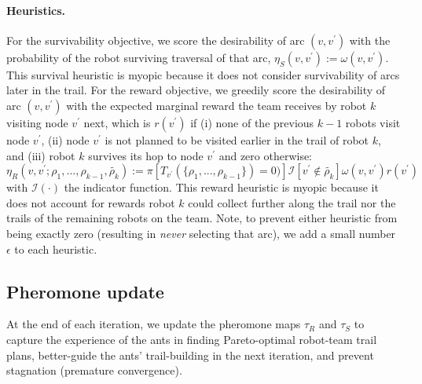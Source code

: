 \documentclass[fleqn,10pt,lineno]{wlpeerj}
\begin{document}

\paragraph{Heuristics.} 
For the survivability objective, we score the desirability of arc $(v, v^\prime)$ with the probability of the robot surviving traversal of that arc, $\eta_S(v, v^\prime):=\omega(v, v^\prime)$. This survival heuristic is myopic because it does not consider survivability of arcs later in the trail. 
For the reward objective, we greedily score the desirability of arc $(v, v^\prime)$ with the expected marginal reward the team receives by robot $k$ visiting node $v^\prime$ next, which is $r(v^\prime)$ if 
(i) none of the previous $k-1$ robots visit node $v^\prime$, 
(ii) node $v^\prime$ is not planned to be visited earlier in the trail of robot $k$, and
(iii) robot $k$ survives its hop to node $v^\prime$
and zero otherwise:
\begin{equation}
	\eta_R(v, v^\prime; \rho_1, ..., \rho_{k-1}, \tilde{\rho_k}) :=  
	 \pi[ T_{v^\prime}(\{\rho_1, ..., \rho_{k-1}\}) = 0)] \mathcal{I}[v^\prime \notin \tilde{\rho_k}] \omega(v, v^\prime) r(v^\prime ) \label{eq:eta_R}
\end{equation}
with $\mathcal{I}(\cdot)$ the indicator function. This reward heuristic is myopic because it does not account for rewards robot $k$ could collect further along the trail nor the trails of the remaining robots on the team. 
Note, to prevent either heuristic from being exactly zero (resulting in \emph{never} selecting that arc), we add a small number $\epsilon$ to each heuristic.


\subsection{Pheromone update}
At the end of each iteration, we update the pheromone maps $\tau_R$ and $\tau_S$ to capture the experience of the ants in finding Pareto-optimal robot-team trail plans, better-guide the ants' trail-building in the next iteration, and prevent stagnation (premature convergence). 
\end{document}
